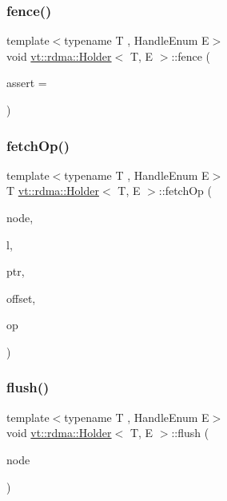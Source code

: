 \subsubsection{\texorpdfstring{fence()}{fence()}}
{\footnotesize\ttfamily template$<$typename T , Handle\+Enum E$>$ \\
void \hyperlink{structvt_1_1rdma_1_1_holder}{vt\+::rdma\+::\+Holder}$<$ T, E $>$\+::fence (\begin{DoxyParamCaption}\item[{int}]{assert = {} }\end{DoxyParamCaption})}

\mbox{\label{structvt_1_1rdma_1_1_holder_a21514973be4a2a9107be043fe727d9f0}} 
\subsubsection{\texorpdfstring{fetch\+Op()}{fetchOp()}}
{\footnotesize\ttfamily template$<$typename T , Handle\+Enum E$>$ \\
T \hyperlink{structvt_1_1rdma_1_1_holder}{vt\+::rdma\+::\+Holder}$<$ T, E $>$\+::fetch\+Op (\begin{DoxyParamCaption}\item[{\hyperlink{namespacevt_a866da9d0efc19c0a1ce79e9e492f47e2}{vt\+::\+Node\+Type}}]{node,  }\item[{\hyperlink{namespacevt_1_1rdma_ac5c20b41a653e520b6305d4d454ecb70}{Lock}}]{l,  }\item[{T}]{ptr,  }\item[{int}]{offset,  }\item[{M\+P\+I\+\_\+\+Op}]{op }\end{DoxyParamCaption})}

\mbox{\label{structvt_1_1rdma_1_1_holder_af2bb524d70bdaa0eaad2a394c0e9b633}} 
\subsubsection{\texorpdfstring{flush()}{flush()}}
{\footnotesize\ttfamily template$<$typename T , Handle\+Enum E$>$ \\
void \hyperlink{structvt_1_1rdma_1_1_holder}{vt\+::rdma\+::\+Holder}$<$ T, E $>$\+::flush (\begin{DoxyParamCaption}\item[{\hyperlink{namespacevt_a866da9d0efc19c0a1ce79e9e492f47e2}{vt\+::\+Node\+Type}}]{node }\end{DoxyParamCaption})}

